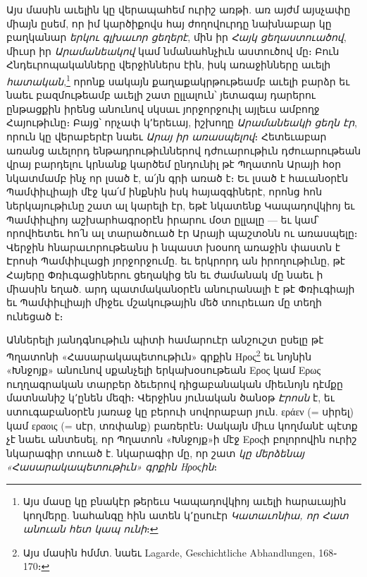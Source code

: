 \documentclass{article}
\begin{document}
{Այս մասին աւելին կը վերապահեմ ուրիշ առթի. առ այժմ այսչափը միայն ըսեմ, որ իմ կարծիքովս հայ ժողովուրդը նախնաբար կը բաղկանար \emph{երկու գլխաւոր ցեղերէ}, մին իր \emph{Հայկ ցեղաստուածով}, միւսր իր \emph{Արամանեակով} կամ նմանահնչիւն աստուծով մը։ Բուն Հնդեւրոպականները վերջիններս էին, իսկ առաջինները աւելի \emph{հատական},\footnote{Այս մասը կը բնակէր թերեւս Կապադովկիոյ աւելի հարաւային կողմերը. նահանգը հին ատեն կ՚ըսուէր \emph{Կատաւոնիա, որ Հատ անուան հետ կապ ունի}։} որոնք սակայն քաղաքակրթութեամբ աւելի բարձր եւ նաեւ բազմութեամբ աւելի շատ ըլլալուն՝ յետագայ դարերու ընթացքին իրենց անունով սկսաւ յորջորջուիլ այլեւս ամբողջ Հայութիւնը։ Բայց՝ որչափ կ՚երեւայ, իշխողը \emph{Արամանեակի ցեղն էր}, որուն կը վերաբերէր նաեւ \emph{Արայ իր առասպելով}։ Հետեւաբար առանց աւելորդ ենթադրութիւններով դժուարութիւն դժուարութեան վրայ բարդելու կրնանք կարծեմ ընդունիլ թէ Պղատոն Արայի հօր նկատմամբ ինչ որ լսած է, ա՛յն գրի առած է։ Եւ լսած է հաւանօրէն Պամփիւլիայի մէջ կա՛մ ինքնին իսկ հայազգիներէ, որոնց հոն ներկայութիւնը շատ ալ կարելի էր, եթէ նկատենք Կապադովկիոյ եւ Պամփիւլիոյ աշխարհագրօրէն իրարու մօտ ըլլալը — եւ կամ՝ որովհետեւ հո՛ն ալ տարածուած էր Արայի պաշտօնն ու առասպելը։ Վերջին հնարաւորութեանս ի նպաստ խօսող առաջին փաստն է Էրոսի Պամփիւլացի յորջորջումը. եւ երկրորդ ան իրողութիւնը, թէ Հայերը Փռիւգացիներու ցեղակից են եւ ժամանակ մը նաեւ ի միասին եղած. արդ պատմականօրէն անուրանալի է թէ Փռիւգիայի եւ Պամփիւլիայի միջեւ մշակութային մեծ տուրեւառ մը տեղի ունեցած է։

Աններելի յանդգնութիւն պիտի համարուէր անշուշտ ըսելը թէ Պղատոնի «Հասարակապետութիւն» գրքին Ηρος\footnote{Այս մասին հմմտ. նաեւ Lagarde, Geschichtliche Abhandlungen, 168֊170։} եւ նոյնին «Խնջոյք» անունով սքանչելի երկախօսութեան Ερος կամ Ερως ուղղագրական տարբեր ձեւերով դիցաբանական միեւնոյն դէմքը մատնանիշ կ՚ընեն մեզի։ Վերջինս յունական ծանօթ \emph{Էրոսն} է, եւ ստուգաբանօրէն յառաջ կը բերուի սովորաբար յուն. εράεν (= սիրել) կամ εραοις (= սէր, տռփանք) բառերէն։ Սակայն միւս կողմանէ պէտք չէ նաեւ անտեսել, որ Պղատոն «Խնջոյք»ի մէջ Εροςի բոլորովին ուրիշ նկարագիր տուած է. նկարագիր մը, որ շատ \emph{կը մերձենայ «Հասարակապետութիւն» գրքին Ηροςին}։

}
\end{document}
